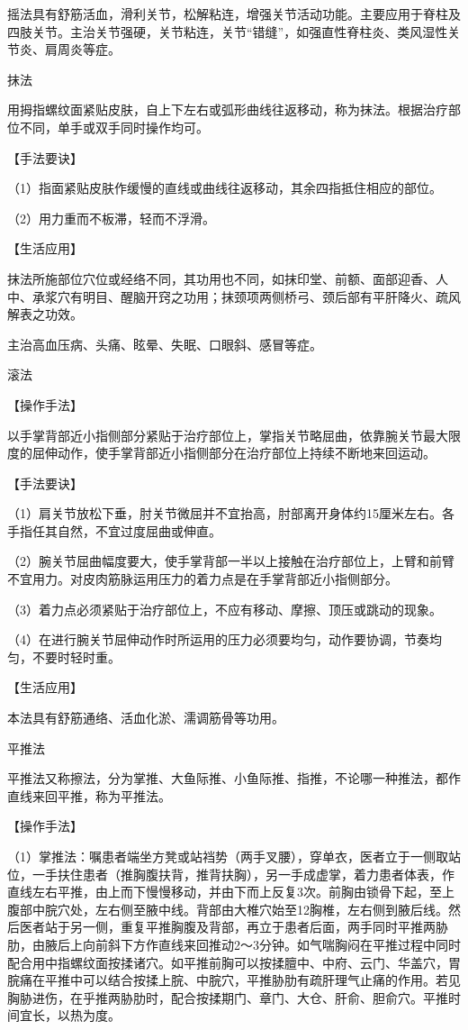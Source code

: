 \documentclass[12pt,UTF8,openany]{ctexbook}
\begin{document}
摇法具有舒筋活血，滑利关节，松解粘连，增强关节活动功能。主要应用于脊柱及四肢关节。主治关节强硬，关节粘连，关节“错缝”，如强直性脊柱炎、类风湿性关节炎、肩周炎等症。

抹法

用拇指螺纹面紧贴皮肤，自上下左右或弧形曲线往返移动，称为抹法。根据治疗部位不同，单手或双手同时操作均可。

【手法要诀】

（1）指面紧贴皮肤作缓慢的直线或曲线往返移动，其余四指抵住相应的部位。

（2）用力重而不板滞，轻而不浮滑。

【生活应用】

抹法所施部位穴位或经络不同，其功用也不同，如抹印堂、前额、面部迎香、人中、承浆穴有明目、醒脑开窍之功用；抹颈项两侧桥弓、颈后部有平肝降火、疏风解表之功效。

主治高血压病、头痛、眩晕、失眠、口眼斜、感冒等症。

滚法

【操作手法】

以手掌背部近小指侧部分紧贴于治疗部位上，掌指关节略屈曲，依靠腕关节最大限度的屈伸动作，使手掌背部近小指侧部分在治疗部位上持续不断地来回运动。

【手法要诀】

（1）肩关节放松下垂，肘关节微屈并不宜抬高，肘部离开身体约15厘米左右。各手指任其自然，不宜过度屈曲或伸直。

（2）腕关节屈曲幅度要大，使手掌背部一半以上接触在治疗部位上，上臂和前臂不宜用力。对皮肉筋脉运用压力的着力点是在手掌背部近小指侧部分。

（3）着力点必须紧贴于治疗部位上，不应有移动、摩擦、顶压或跳动的现象。

（4）在进行腕关节屈伸动作时所运用的压力必须要均匀，动作要协调，节奏均匀，不要时轻时重。

【生活应用】

本法具有舒筋通络、活血化淤、濡调筋骨等功用。

平推法

平推法又称擦法，分为掌推、大鱼际推、小鱼际推、指推，不论哪一种推法，都作直线来回平推，称为平推法。

【操作手法】

（1）掌推法：嘱患者端坐方凳或站裆势（两手叉腰），穿单衣，医者立于一侧取站位，一手扶住患者（推胸腹扶背，推背扶胸），另一手成虚掌，着力患者体表，作直线左右平推，由上而下慢慢移动，并由下而上反复3次。前胸由锁骨下起，至上腹部中脘穴处，左右侧至腋中线。背部由大椎穴始至12胸椎，左右侧到腋后线。然后医者站于另一侧，重复平推胸腹及背部，再立于患者后面，两手同时平推两胁肋，由腋后上向前斜下方作直线来回推动2～3分钟。如气喘胸闷在平推过程中同时配合用中指螺纹面按揉诸穴。如平推前胸可以按揉膻中、中府、云门、华盖穴，胃脘痛在平推中可以结合按揉上脘、中脘穴，平推胁肋有疏肝理气止痛的作用。若见胸胁进伤，在乎推两胁肋时，配合按揉期门、章门、大仓、肝俞、胆俞穴。平推时间宜长，以热为度。
\end{document}
